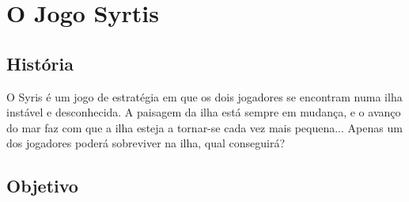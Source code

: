 \documentclass[a4paper]{article}
\begin{document}

\newpage

%
%
%
%
%
%
%


\section{O Jogo Syrtis}

\subsection{História}

	O Syris é um jogo de estratégia em que os dois jogadores se encontram numa ilha instável e desconhecida. A paisagem da ilha está sempre em mudança, e o avanço do mar faz com que a ilha esteja a tornar-se cada vez mais pequena... Apenas um dos jogadores poderá sobreviver na ilha, qual conseguirá?
	
\subsection{Objetivo}
	
\end{document}
